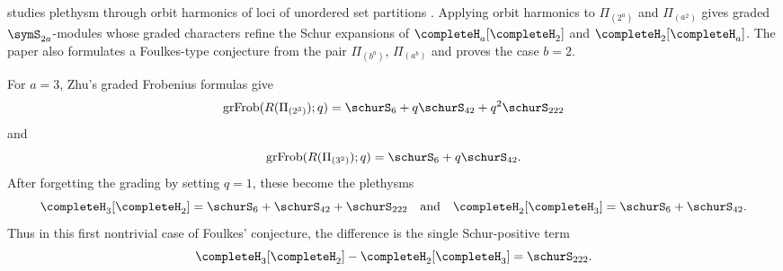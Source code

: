  studies plethysm through orbit harmonics of loci of unordered
set partitions \cite{Zhu2026x}.  Applying orbit harmonics to
$\Pi_{(2^a)}$ and $\Pi_{(a^2)}$ gives graded $\symS_{2a}$-modules whose
graded characters refine the Schur expansions of $\completeH_a[\completeH_2]$
and $\completeH_2[\completeH_a]$.  The paper also formulates a
Foulkes-type conjecture from the pair $\Pi_{(b^a)}$, $\Pi_{(a^b)}$ and proves
the case $b=2$.

\begin{example*}
For $a=3$, Zhu's graded Frobenius formulas
\cite[Thms.~3.3 and 3.5]{Zhu2026x} give
\[
  \operatorname{grFrob}(R(\Pi_{(2^3)});q)
  = \schurS_{6}+q\schurS_{42}+q^2\schurS_{222}
\]
and
\[
  \operatorname{grFrob}(R(\Pi_{(3^2)});q)
  = \schurS_{6}+q\schurS_{42}.
\]
After forgetting the grading by setting $q=1$, these become the plethysms
\[
  \completeH_3[\completeH_2]
  = \schurS_{6}+\schurS_{42}+\schurS_{222}
  \quad\text{and}\quad
  \completeH_2[\completeH_3]
  = \schurS_{6}+\schurS_{42}.
\]
Thus in this first nontrivial case of Foulkes' conjecture, the difference is
the single Schur-positive term
\[
  \completeH_3[\completeH_2]-\completeH_2[\completeH_3]
  = \schurS_{222}.
\]
\end{example*}
